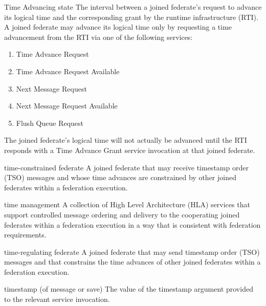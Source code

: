 \newpage
\begin{definition}{Time Advancing state}
    The interval between a joined federate's request to advance its logical time and the corresponding grant by the runtime infrastructure (RTI). A joined federate may advance its logical time only by requesting a time advancement from the RTI via one of the following services:
\end{definition}

\begin{enumerate}[label=\alph*)]
\item Time Advance Request
\item Time Advance Request Available
\item Next Message Request
\item Next Message Request Available
\item Flush Queue Request
\end{enumerate}

The joined federate's logical time will not actually be advanced until the RTI responds with a Time Advance Grant \textdagger{} service invocation at that joined federate.\par

\begin{definition}{time-constrained federate}
    A joined federate that may receive timestamp order (TSO) messages and whose time advances are constrained by other joined federates within a federation execution.
\end{definition}


\begin{definition}{time management}
    A collection of High Level Architecture (HLA) services that support controlled message ordering and delivery to the cooperating joined federates within a federation execution in a way that is consistent with federation requirements.
\end{definition}

\begin{definition}{time-regulating federate}
    A joined federate that may send timestamp order (TSO) messages and that constrains the time advances of other joined federates within a federation execution.
\end{definition}


\begin{definition}{timestamp (of message or save)}
    The value of the timestamp argument provided to the relevant service invocation.
\end{definition}

